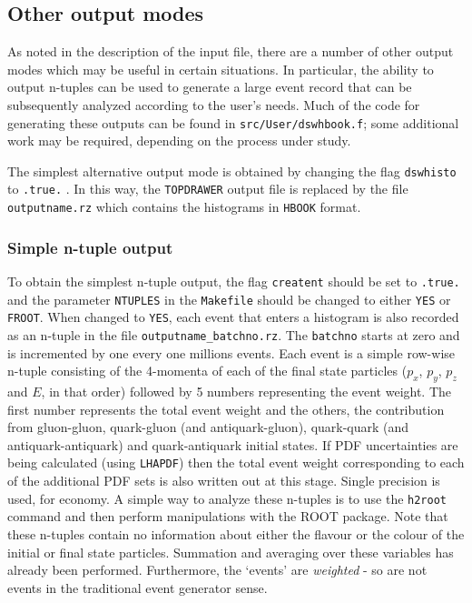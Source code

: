 \documentclass[12pt]{article}
\begin{document}
\subsection{Other output modes}
\label{subsec:otheroutput}
As noted in the description of the input file, there are a number of other
output modes which may be useful in certain situations. In particular, the
ability to output n-tuples can be used to generate a large event record that 
can be subsequently analyzed according to the user's needs. Much of the code
for generating these outputs can be found in {\tt src/User/dswhbook.f}; some
additional work may be required, depending on the process under study.

The simplest alternative output mode is obtained by changing the flag
{\tt dswhisto} to {\tt .true.} . In this way, the {\tt TOPDRAWER} output file is
replaced by the file {\tt outputname.rz} which contains the histograms in {\tt HBOOK}
format.

\subsubsection{Simple n-tuple output}
To obtain the simplest n-tuple output, the flag {\tt creatent} should be set
to {\tt .true.} and the parameter {\tt NTUPLES} in the {\tt Makefile} should be changed
to either {\tt YES} or {\tt FROOT}. When changed to {\tt YES}, each event that enters a histogram
is also recorded as an n-tuple in the file {\tt outputname\_batchno.rz}. The {\tt batchno}
starts at zero and is incremented by one every one millions events. Each event
is a simple row-wise n-tuple consisting of the 4-momenta of each of the final
state particles ($p_x$, $p_y$, $p_z$ and $E$, in that order) followed by 5 numbers
representing the event weight. The first number represents the total event weight
and the others, the contribution from gluon-gluon, quark-gluon (and antiquark-gluon),
quark-quark (and antiquark-antiquark) and quark-antiquark initial states. If
PDF uncertainties are being calculated (using {\tt LHAPDF}) then the total event weight
corresponding to each of the additional PDF sets is also written out at this stage.
Single precision is used, for economy. A simple way to analyze 
these n-tuples is to use the {\tt h2root} command and then perform
manipulations with the ROOT package. Note that these n-tuples contain
no information about either the flavour or the colour of the initial or final
state particles. Summation and averaging over these variables has already been
performed. Furthermore, the `events' are {\it weighted} - so are not events
in the traditional event generator sense.
\end{document}
